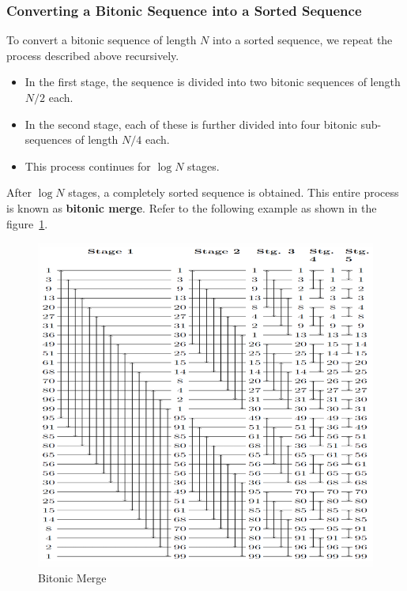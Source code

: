 \documentclass[12pt]{book}
\begin{document}
\subsubsection{Converting a Bitonic Sequence into a Sorted Sequence}

To convert a bitonic sequence of length $N$ into a sorted sequence, we repeat the process described above recursively. 

\begin{itemize}
    \item In the first stage, the sequence is divided into two bitonic sequences of length $N/2$ each.
    \item In the second stage, each of these is further divided into four bitonic sub-sequences of length $N/4$ each.
    \item This process continues for $\log N$ stages.
\end{itemize}

After $\log N$ stages, a completely sorted sequence is obtained. This entire process is known as \textbf{bitonic merge}. Refer to the following example as shown in the figure~\ref{fig:bitonicmerge}.
\begin{figure}[ht]
    \centering
    \includegraphics[width=\linewidth]{images/BitonicMerge.png}
    \caption{Bitonic Merge}
    \label{fig:bitonicmerge}
\end{figure}
\end{document}
